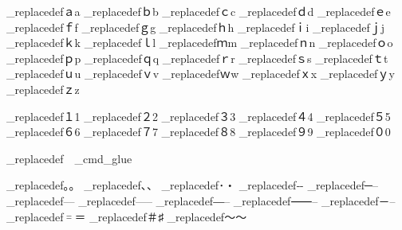 {\brl@document_replacedef{ａ}{a}
\brl@document_replacedef{ｂ}{b}
\brl@document_replacedef{ｃ}{c}
\brl@document_replacedef{ｄ}{d}
\brl@document_replacedef{ｅ}{e}
\brl@document_replacedef{ｆ}{f}
\brl@document_replacedef{ｇ}{g}
\brl@document_replacedef{ｈ}{h}
\brl@document_replacedef{ｉ}{i}
\brl@document_replacedef{ｊ}{j}
\brl@document_replacedef{ｋ}{k}
\brl@document_replacedef{ｌ}{l}
\brl@document_replacedef{ｍ}{m}
\brl@document_replacedef{ｎ}{n}
\brl@document_replacedef{ｏ}{o}
\brl@document_replacedef{ｐ}{p}
\brl@document_replacedef{ｑ}{q}
\brl@document_replacedef{ｒ}{r}
\brl@document_replacedef{ｓ}{s}
\brl@document_replacedef{ｔ}{t}
\brl@document_replacedef{ｕ}{u}
\brl@document_replacedef{ｖ}{v}
\brl@document_replacedef{ｗ}{w}
\brl@document_replacedef{ｘ}{x}
\brl@document_replacedef{ｙ}{y}
\brl@document_replacedef{ｚ}{z}

\brl@document_replacedef{１}{1}
\brl@document_replacedef{２}{2}
\brl@document_replacedef{３}{3}
\brl@document_replacedef{４}{4}
\brl@document_replacedef{５}{5}
\brl@document_replacedef{６}{6}
\brl@document_replacedef{７}{7}
\brl@document_replacedef{８}{8}
\brl@document_replacedef{９}{9}
\brl@document_replacedef{０}{0}

\brl@document_replacedef{　}{\brl@text_cmd_glue}

\brl@document_replacedef{｡}{。}%
\brl@document_replacedef{､}{、}%
\brl@document_replacedef{･}{・}%
\brl@document_replacedef{‐}{-}%
\brl@document_replacedef{─}{--}%
\brl@document_replacedef{–}{--}%
\brl@document_replacedef{—}{--}%
\brl@document_replacedef{―}{--}%
\brl@document_replacedef{⸺}{--}%
\brl@document_replacedef{－}{--}%
\brl@document_replacedef{゠}{＝}%
\brl@document_replacedef{＃}{♯}
\brl@document_replacedef{～}{〜}%

% 



}
